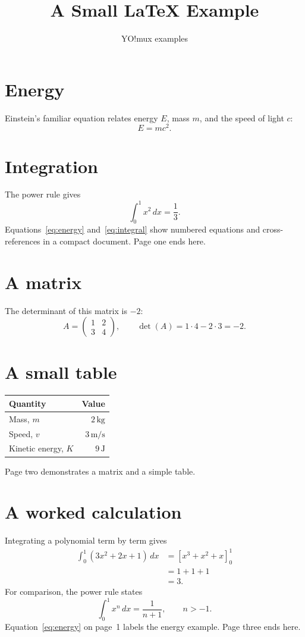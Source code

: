 \documentclass[11pt]{article}
\title{A Small LaTeX Example}
\author{YO!mux examples}
\date{}
\begin{document}
\maketitle

\section{Energy}
Einstein's familiar equation relates energy $E$, mass $m$, and the speed of
light $c$:
\begin{equation}
E = mc^2.
\label{eq:energy}
\end{equation}

\section{Integration}
The power rule gives
\begin{equation}
\int_0^1 x^2\,dx = \frac{1}{3}.
\label{eq:integral}
\end{equation}
Equations~\eqref{eq:energy} and~\eqref{eq:integral} show numbered equations
and cross-references in a compact document.
\vfill
Page one ends here.

\newpage
\section{A matrix}
The determinant of this matrix is $-2$:
\[
A = \begin{pmatrix}1 & 2 \\ 3 & 4\end{pmatrix},
\qquad \det(A) = 1\cdot4 - 2\cdot3 = -2.
\]

\section{A small table}
\begin{center}
\begin{tabular}{lr}
\hline
Quantity & Value \\
\hline
Mass, $m$ & $2\,\mathrm{kg}$ \\
Speed, $v$ & $3\,\mathrm{m/s}$ \\
Kinetic energy, $K$ & $9\,\mathrm{J}$ \\
\hline
\end{tabular}
\end{center}
Page two demonstrates a matrix and a simple table.

\newpage
\section{A worked calculation}
Integrating a polynomial term by term gives
\begin{align*}
\int_0^1 (3x^2 + 2x + 1)\,dx
&= \left[x^3 + x^2 + x\right]_0^1 \\
&= 1 + 1 + 1 \\
&= 3.
\end{align*}
For comparison, the power rule states
\[
\int_0^1 x^n\,dx = \frac{1}{n+1}, \qquad n > -1.
\]
Equation~\eqref{eq:energy} on page~1 labels the energy example.
\vfill
Page three ends here.
\end{document}
